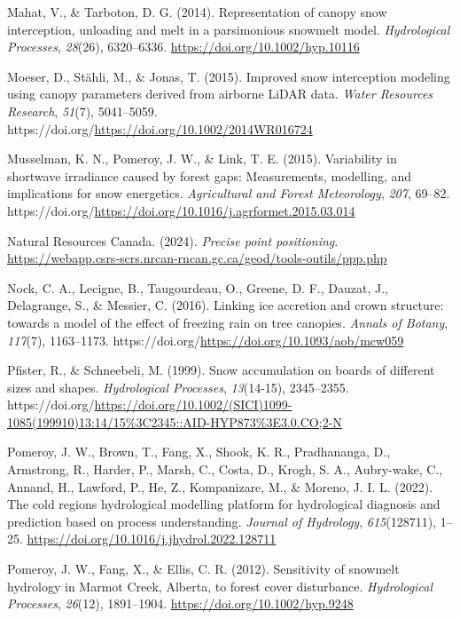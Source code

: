 \documentclass[
  letterpaper,
  DIV=11,
  numbers=noendperiod]{scrartcl}
\newlength{\cslhangindent}
\newenvironment{CSLReferences}[2] %
 {\begin{list}{}{%
  \setlength{\itemindent}{0pt}
  \setlength{\leftmargin}{0pt}
  \setlength{\parsep}{0pt}
  \ifodd #1
   \setlength{\leftmargin}{\cslhangindent}
   \setlength{\itemindent}{-1\cslhangindent}
  \fi
  \setlength{\itemsep}{#2\baselineskip}}}
 {\end{list}}
\begin{document}
\begin{CSLReferences}{1}{0}
Mahat, V., \& Tarboton, D. G. (2014). {Representation of canopy snow
interception, unloading and melt in a parsimonious snowmelt model}.
\emph{Hydrological Processes}, \emph{28}(26), 6320--6336.
\url{https://doi.org/10.1002/hyp.10116}

Moeser, D., Stähli, M., \& Jonas, T. (2015). {Improved snow interception
modeling using canopy parameters derived from airborne LiDAR data}.
\emph{Water Resources Research}, \emph{51}(7), 5041--5059.
https://doi.org/\url{https://doi.org/10.1002/2014WR016724}

Musselman, K. N., Pomeroy, J. W., \& Link, T. E. (2015). {Variability in
shortwave irradiance caused by forest gaps: Measurements, modelling, and
implications for snow energetics}. \emph{Agricultural and Forest
Meteorology}, \emph{207}, 69--82.
https://doi.org/\url{https://doi.org/10.1016/j.agrformet.2015.03.014}

Natural Resources Canada. (2024). \emph{{Precise point positioning}}.
\url{https://webapp.csrs-scrs.nrcan-rncan.gc.ca/geod/tools-outils/ppp.php}

Nock, C. A., Lecigne, B., Taugourdeau, O., Greene, D. F., Dauzat, J.,
Delagrange, S., \& Messier, C. (2016). {Linking ice accretion and crown
structure: towards a model of the effect of freezing rain on tree
canopies}. \emph{Annals of Botany}, \emph{117}(7), 1163--1173.
https://doi.org/\url{https://doi.org/10.1093/aob/mcw059}

Pfister, R., \& Schneebeli, M. (1999). {Snow accumulation on boards of
different sizes and shapes}. \emph{Hydrological Processes},
\emph{13}(14-15), 2345--2355.
https://doi.org/\url{https://doi.org/10.1002/(SICI)1099-1085(199910)13:14/15\%3C2345::AID-HYP873\%3E3.0.CO;2-N}

Pomeroy, J. W., Brown, T., Fang, X., Shook, K. R., Pradhananga, D.,
Armstrong, R., Harder, P., Marsh, C., Costa, D., Krogh, S. A.,
Aubry-wake, C., Annand, H., Lawford, P., He, Z., Kompanizare, M., \&
Moreno, J. I. L. (2022). {The cold regions hydrological modelling
platform for hydrological diagnosis and prediction based on process
understanding}. \emph{Journal of Hydrology}, \emph{615}(128711), 1--25.
\url{https://doi.org/10.1016/j.jhydrol.2022.128711}

Pomeroy, J. W., Fang, X., \& Ellis, C. R. (2012). {Sensitivity of
snowmelt hydrology in Marmot Creek, Alberta, to forest cover
disturbance}. \emph{Hydrological Processes}, \emph{26}(12), 1891--1904.
\url{https://doi.org/10.1002/hyp.9248}


\end{CSLReferences}
\end{document}

